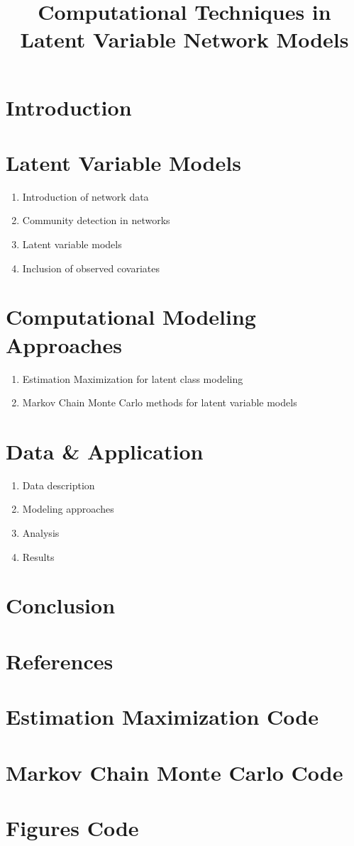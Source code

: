 \documentclass{article}
\title{Computational Techniques in Latent Variable Network Models}
\begin{document}
\maketitle

\section{Introduction}

\section{Latent Variable Models}

\begin{enumerate}
    \item Introduction of network data
    \item Community detection in networks
    \item Latent variable models 
    \item Inclusion of observed covariates
\end{enumerate}

\section{Computational Modeling Approaches}

\begin{enumerate}
    \item Estimation Maximization for latent class modeling
    \item Markov Chain Monte Carlo methods for latent variable models
\end{enumerate}

\section{Data \& Application}

\begin{enumerate}
    \item Data description
    \item Modeling approaches
    \item Analysis
    \item Results
\end{enumerate}

\section{Conclusion}

\section{References}

\appendix 

\section{Estimation Maximization Code}
\section{Markov Chain Monte Carlo Code}
\section{Figures Code}
\end{document}
